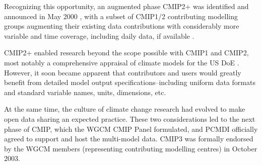 \documentclass[manuscript]{copernicus}
\newcommand{\mycomment}[1]{}
\begin{document}
Recognizing this opportunity, an augmented phase CMIP2+ was identified and announced in May 2000 \citep{villwock_6th_2003, meehl_cmip_2003, meehl_overview_2005}, with a subset of CMIP1/2 contributing modelling groups augmenting their existing data contributions with considerably more variable and time coverage, including daily data, if available \citep{achutarao_pcmdi_2004}.

CMIP2+ enabled research beyond the scope possible with CMIP1 and CMIP2, most notably a comprehensive appraisal of climate models for the US DoE \citep{achutarao_pcmdi_2004}. However, it soon became apparent that contributors and users would greatly benefit from detailed model output specifications--including uniform data formats and standard variable names, units, dimensions, etc.

At the same time, the culture of climate change research had evolved to make open data sharing an expected practice. These two considerations led to the next phase of CMIP, which the WGCM CMIP Panel formulated, and PCMDI officially agreed to support and host the multi-model data. CMIP3 was formally endorsed by the WGCM members (representing contributing modelling centres) in October 2003.

\mycomment{
Curt C to provide a sentence or two about the dramatic growth of the registered subprojects that had been the standard engagement way in AMIP1/2, CMIP1/2 and how that led to the opening up of the CMIP3 archive to open-access FTP, and no registered subprojects? - If I have that right? (already above)
Meehl, 2019 AGU WCRP40 presentation https://www.wcrp-climate.org/images/AGU2019/presentations/Symposium/11-Meehl_WCRP40.pdf
ETH Zurich CMIP1/2 data pools
https://data.iac.ethz.ch/atmos/index.html#/data/cmip2 - 3 GB, 526 files
WGOMD establishment after WGCM-2 in Melbourne Oct 1998 - see https://eprints.soton.ac.uk/30149/1/040_wgcm4.pdf#Page=9 /sect3.5 also JSC-21 also see https://www.wcrp-climate.org/modelling-wgcm-publications
CMIP1/2/2+ announcement emails for timing - https://web.archive.org/web/20040827091054/http://www-pcmdi.llnl.gov/cmip/
Also PMIP 1991 - prescribed SSTs AGCMs \citep{braconnot_paleoclimate_2011} \textbf{(Karl to help here)}
Also AMIP2 proceedings, Gleckler et al 2005 - https://pcmdi.llnl.gov/mips/amip/amip2\_workshop\_proceedings.pdf#page=11 - https://www.osti.gov/biblio/15014509
And Potter 1999 - new strategy beyond AMIP - https://www.osti.gov/biblio/791127
}
\end{document}
